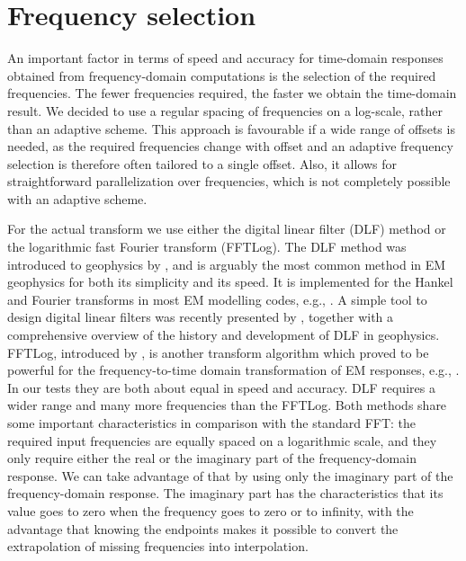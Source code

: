\documentclass[
    manuscript,
  ]{geophysics}
\begin{document}
\section{Frequency selection}

An important factor in terms of speed and accuracy for time-domain responses
obtained from frequency-domain computations is the selection of the required
frequencies. The fewer frequencies required, the faster we obtain the
time-domain result. We decided to use a regular spacing of frequencies on a
log-scale, rather than an adaptive scheme. This approach is favourable if a
wide range of offsets is needed, as the required frequencies change with offset
and an adaptive frequency selection is therefore often tailored to a single
offset. Also, it allows for straightforward parallelization over frequencies,
which is not completely possible with an adaptive scheme.

For the actual transform we use either the digital linear filter (DLF) method
or the logarithmic fast Fourier transform (FFTLog). The DLF method was
introduced to geophysics by \cite{GP.71.Ghosh}, and is arguably the most common
method in EM geophysics for both its simplicity and its speed. It is
implemented for the Hankel and Fourier transforms in most EM modelling codes,
e.g., \cite{GEO.09.Key}. A simple tool to design digital linear filters was
recently presented by \cite{GEO.19.Werthmuller}, together with a comprehensive
overview of the history and development of DLF in geophysics. FFTLog,
introduced by \cite{RAS.00.Hamilton}, is another transform algorithm which
proved to be powerful for the frequency-to-time domain transformation of EM
responses, e.g., \cite{INT.14.Werthmuller}. In our tests they are both about
equal in speed and accuracy. DLF requires a wider range and many more
frequencies than the FFTLog. Both methods share some important characteristics
in comparison with the standard FFT: the required input frequencies are equally
spaced on a logarithmic scale, and they only require either the real or the
imaginary part of the frequency-domain response. We can take advantage of that
by using only the imaginary part of the frequency-domain response. The
imaginary part has the characteristics that its value goes to zero when the
frequency goes to zero or to infinity, with the advantage that knowing the
endpoints makes it possible to convert the extrapolation of missing frequencies
into interpolation.
\end{document}
